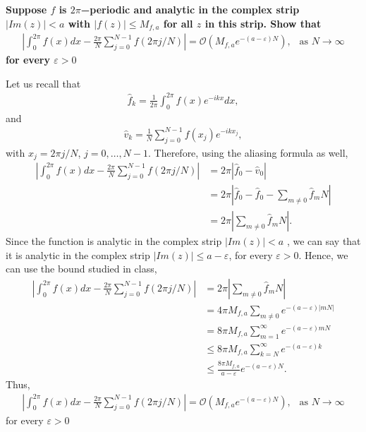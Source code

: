 \textbf{Suppose $f$ is $2\pi$−periodic and analytic in the complex strip $|Im(z)|<a$  with $|f(z)|\leq M_{f,a}$ for all $z$ in this strip. Show that
\begin{align*}
\left|\int_0^{2\pi}f(x)dx-\frac{2\pi}{N}\sum_{j=0}^{N-1}f(2\pi j/N)\right|=\mathcal{O}\left(M_{f,a}e^{-(a-\varepsilon)N}\right),~~\text{ as }N\rightarrow\infty
\end{align*}
for every $\varepsilon > 0$
}
\newline

Let us recall that 
\begin{align*}
\hat{f}_k=\frac{1}{2\pi}\int_0^{2\pi}f(x)e^{-ikx}dx,
\end{align*}
and
\begin{align*}
\hat{v}_k=\frac{1}{N}\sum_{j=0}^{N-1}f(x_j)e^{-ikx_j},
\end{align*}
with $x_j=2\pi j/N$, $j=0,\dots,N-1$. Therefore, using the aliasing formula as well,
\begin{align*}
\left|\int_0^{2\pi}f(x)dx-\frac{2\pi}{N}\sum_{j=0}^{N-1}f(2\pi j/N)\right| &= 2\pi\left|\hat{f}_0-\hat{v}_0\right|\\
&= 2\pi\left|\hat{f}_0-\hat{f}_0-\sum_{m\neq 0}\hat{f}_mN\right|\\
&= 2\pi\left|\sum_{m\neq 0}\hat{f}_mN\right|.
\end{align*}
Since the function is analytic in the complex strip $|Im(z)|<a$ , we can say that it is analytic in the complex strip $|Im(z)|\leq a-\varepsilon$, for every $\varepsilon>0$. Hence, we can use the bound studied in class,
\begin{align*}
\left|\int_0^{2\pi}f(x)dx-\frac{2\pi}{N}\sum_{j=0}^{N-1}f(2\pi j/N)\right| &= 2\pi\left|\sum_{m\neq 0}\hat{f}_mN\right|\\
&= 4\pi M_{f,a}\sum_{m\neq 0}e^{-(a-\varepsilon)\left|mN\right|}\\
&= 8\pi M_{f,a}\sum_{m=1}^{\infty}e^{-(a-\varepsilon)mN}\\
&\leq 8\pi M_{f,a}\sum_{k=N}^{\infty}e^{-(a-\varepsilon)k}\\
&\leq \frac{8\pi M_{f,a}}{a-\varepsilon}e^{-(a-\varepsilon)N}.
\end{align*}
Thus,
\begin{align*}
\left|\int_0^{2\pi}f(x)dx-\frac{2\pi}{N}\sum_{j=0}^{N-1}f(2\pi j/N)\right|=\mathcal{O}\left(M_{f,a}e^{-(a-\varepsilon)N}\right),~~\text{ as }N\rightarrow\infty
\end{align*}
for every $\varepsilon > 0$